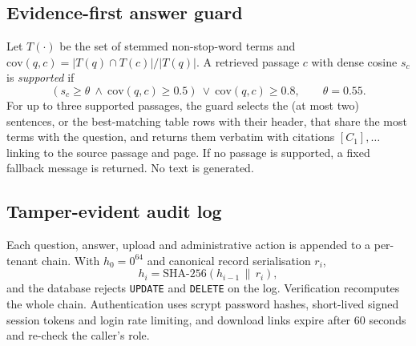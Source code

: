 \documentclass[journal]{IEEEtran}
\begin{document}
\begin{table}[!t]
\caption{Access lattice: roles allowed to read each classification.}\label{tab:lattice}
\centering\small
{}
\end{table}

\subsection{Evidence-first answer guard}
Let $T(\cdot)$ be the set of stemmed non-stop-word terms and $\mathrm{cov}(q,c)=|T(q)\cap T(c)|/|T(q)|$. A retrieved passage $c$ with dense cosine $s_c$ is \emph{supported} if
\begin{equation}
(s_c\ge\theta\ \wedge\ \mathrm{cov}(q,c)\ge 0.5)\ \vee\ \mathrm{cov}(q,c)\ge 0.8,\qquad \theta=0.55 .
\end{equation}
For up to three supported passages, the guard selects the (at most two) sentences, or the best-matching table rows with their header, that share the most terms with the question, and returns them verbatim with citations $[C_1],\dots$ linking to the source passage and page. If no passage is supported, a fixed fallback message is returned. No text is generated.

\subsection{Tamper-evident audit log}
Each question, answer, upload and administrative action is appended to a per-tenant chain. With $h_0=0^{64}$ and canonical record serialisation $r_i$,
\begin{equation}
h_i=\mathrm{SHA\text{-}256}(h_{i-1}\,\|\,r_i),
\end{equation}
and the database rejects \texttt{UPDATE} and \texttt{DELETE} on the log. Verification recomputes the whole chain. Authentication uses scrypt password hashes, short-lived signed session tokens and login rate limiting, and download links expire after 60 seconds and re-check the caller's role.
\end{document}

